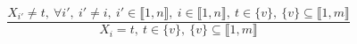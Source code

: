 $$\frac{X_{i'} \neq t,~\forall i',~i' \neq i,~i' \in \llbracket1,n\rrbracket,~i \in \llbracket1,n\rrbracket,~t \in \{v\},~\{v\} \subseteq \llbracket1,m\rrbracket}{X_{i}=t,~t \in \{v\},~\{v\} \subseteq \llbracket1,m\rrbracket}$$ 
